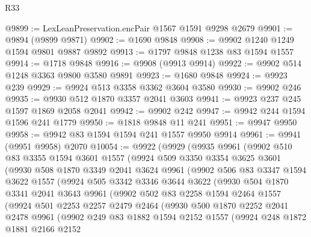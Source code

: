 \begin{lexlean}{R33}
\begin{coremodule}
@9899 := LexLeanPreservation.encPair @1567 @1591 @9298 @2679
@9901 := @9894 (@9899 @9871)
@9902 := @1690 @9848
@9908 := @9902 @1240 @1249 @1594 @9801 @9887 @9892
@9913 := @1797 @9848 @1238 @83 @1594 @1557
@9914 := @1718 @9848
@9916 := @9908 (@9913 @9914)
@9922 := @9902 @514 @1248 @3363 @9800 @3580 @9891
@9923 := @1680 @9848
@9924 := @9923 @239
@9929 := @9924 @513 @3358 @3362 @3604 @3580
@9930 := @9902 @246
@9935 := @9930 @512 @1870 @3357 @2041 @3603
@9941 := @9923 @237 @245 @1597 @1869 @2058 @2041
@9942 := @9902 @242
@9947 := @9942 @244 @1594 @1596 @241 @1779
@9950 := @1818 @9848 @11 @241
@9951 := @9947 @9950
@9958 := @9942 @83 @1594 @1594 @241 @1557 @9950 @9914
@9961 := @9941 (@9951 @9958) @2070
@10054 := @9922
    (@9929
      (@9935
        @9961
        (@9902
          @510
          @83
          @3355
          @1594
          @3601
          @1557
          (@9924
            @509
            @3350
            @3354
            @3625
            @3601
            (@9930
              @508
              @1870
              @3349
              @2041
              @3624
              @9961
              (@9902
                @506
                @83
                @3347
                @1594
                @3622
                @1557
                (@9924
                  @505
                  @3342
                  @3346
                  @3644
                  @3622
                  (@9930
                    @504
                    @1870
                    @3341
                    @2041
                    @3643
                    @9961
                    (@9902
                      @502
                      @83
                      @2258
                      @1594
                      @2464
                      @1557
                      (@9924
                        @501
                        @2253
                        @2257
                        @2479
                        @2464
                        (@9930
                          @500
                          @1870
                          @2252
                          @2041
                          @2478
                          @9961
                          (@9902
                            @249
                            @83
                            @1882
                            @1594
                            @2152
                            @1557
                            (@9924
                              @248
                              @1872
                              @1881
                              @2166
                              @2152

\end{coremodule}
\end{lexlean}
